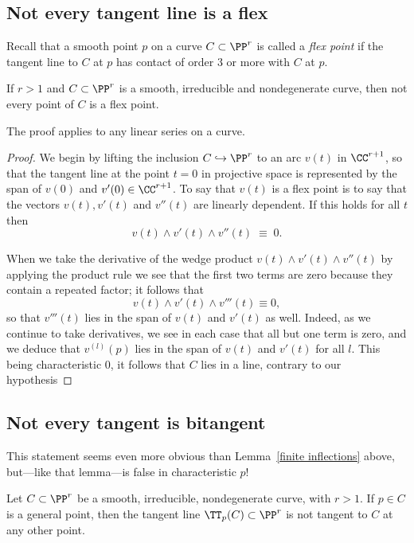 \subsection{Not every tangent line is a flex}\label{isolated tangents and bitangents}

Recall that a smooth point $p$ on a curve $C \subset \PP^r$ is called a \emph{flex point} if the tangent line to $C$ at  $p$ has contact of order 3 or more with $C$ at $p$.

\begin{lemma}\label{finite inflections}
If $r>1$ and $C \subset \PP^r$ is a smooth, irreducible and nondegenerate curve, then not every point of $C$ is a flex point.
\end{lemma}

The proof applies to any linear series on a curve.

\begin{proof}
We begin by lifting the inclusion $C \hookrightarrow \PP^r$ to an arc $v (t)$ in $\CC^{r+1}$, so that the tangent line at the point $t=0$ in projective space
is represented by the span of $v(0)$ and $v'(0) \in \CC^{r+1}$. To say that $v(t)$ is a flex point is to say that the  vectors $v(t), v'(t)$ and $v''(t)$ are linearly dependent. If this holds for all $t$ then
$$
v(t) \wedge  v'(t) \wedge v''(t) \; \equiv \; 0.
$$

When we take the derivative of the wedge product $v(t) \wedge v'(t) \wedge v''(t)$ by applying the product rule we see that the first two terms are zero because they contain a repeated factor; it follows that
$$
v(t) \wedge  v'(t) \wedge v'''(t) \equiv 0,
$$
so that $v'''(t)$ lies in the span of $v(t)$ and $v'(t)$ as well. Indeed, as we continue to take derivatives, we see in each case that all but one term is zero, and we deduce that $v^{(l)}(p)$ lies in the span of $v(t)$ and $v'(t)$ for all $l$. This being characteristic 0, it follows that $C$ lies in a line, contrary to our hypothesis
\end{proof}


 \subsection{Not every tangent is bitangent}
 
 This statement seems even more obvious than Lemma~\ref{finite inflections} above, but---like that lemma---is false in characteristic $p$! 
 
 \begin{lemma}\label{tangent not bitangent}
 Let $C \subset \PP^r$ be a smooth, irreducible, nondegenerate curve, with $r > 1$. If $p \in C$ is a general point, then the tangent line $\TT_p(C) \subset \PP^r$ is not tangent to $C$ at any other point.
 \end{lemma}
 
